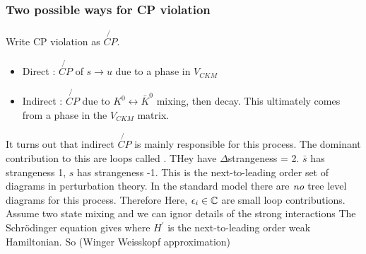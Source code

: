\documentclass{article}
\begin{document}
\subsubsection*{Two possible ways for CP violation}
Write CP violation as $\not{CP}$. 
\begin{itemize}
    \item Direct : $\not{CP}$ of $s \to u$ due to a phase in $V_{CKM}$
    \item Indirect : $\not{CP}$ due to $K^0 \leftrightarrow \bar{K}^0$ mixing, then decay. This ultimately comes from a phase in the $V_{CKM}$ matrix.
\end{itemize}
It turns out that indirect $\not{CP}$ is mainly responsible for this process. The dominant contribution to this are loops called . THey have $\Delta$strangeness = 2. $\bar{s}$ has strangeness 1, $s$ has strangeness -1. This is the next-to-leading order set of diagrams in perturbation theory. In the standard model there are $\emph{no}$ tree level diagrams for this process. Therefore 
Here, $\epsilon_i\in\mathbb{C}$ are small loop contributions. \\
\newline
Assume two state mixing and we can ignor details of the strong interactions 
The Schr\"odinger equation gives 
where $H^\prime$ is the next-to-leading order weak Hamiltonian. So 
(Winger Weisskopf approximation)
\end{document}
